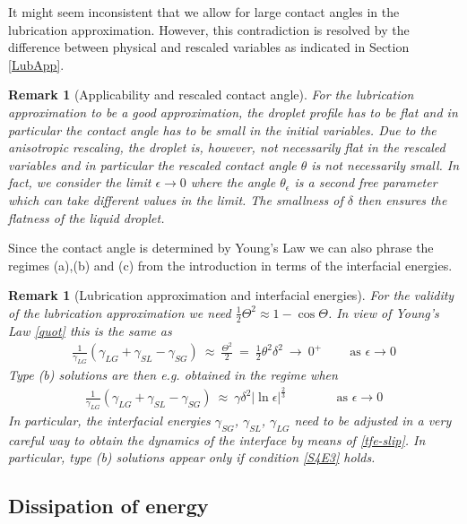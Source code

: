\documentclass[pagesize,pdftex]{amsart}
\newtheorem{remark}[theorem]{Remark}
\renewcommand{\d}{\delta}
\newcommand{\gam}{\gamma}
\newcommand{\eps}{\epsilon}
\newcommand{\ang}{\theta}
\begin{document}
 It might seem inconsistent that we allow for large contact angles in the
 lubrication approximation. However, this contradiction is resolved by the
 difference between physical and rescaled variables as indicated in Section
 \ref{LubApp}.
 \begin{remark}[Applicability and rescaled contact angle] \label{rem-consist} %
   \text{} %
   For the lubrication approximation to be a good approximation, the droplet
   profile has to be flat and in particular the contact angle has to be small in
   the initial variables.  Due to the anisotropic rescaling, the droplet is,
   however, not necessarily flat in the rescaled variables and in particular the
   rescaled contact angle $\ang$ is not necessarily small. In fact, we consider
   the limit $\eps \to 0$ where the angle $\ang_\eps$ is a second free parameter
   which can take different values in the limit. The smallness of $\delta$ then
   ensures the flatness of the liquid droplet.
\end{remark}
Since the contact angle is determined by Young's Law we can also phrase the
regimes (a),(b) and (c) from the introduction in terms of the interfacial
energies.
\begin{remark}[Lubrication approximation and interfacial energies]
  For the validity of the lubrication approximation we need
  $\frac 12 \Theta^2 \approx 1 - \cos \Theta$. In view of Young's Law
  \eqref{quot} this is the same as
  \begin{align}
      \frac 1{\gam_{LG}} (\gam_{LG} + \gam_{SL} - \gam_{SG})  \ %
      \approx  \ \frac {\Theta^2}{2} \ %
      = \ \frac 12 \ang^2 \d^2 \ %
      \to \ 0^+ \ \qquad %
      \text{as\ $\eps \to 0$}  \label{S4E2}
  \end{align}
  Type (b) solutions are then e.g. obtained in the regime when
  \begin{align}
      \frac 1{\gam_{LG}} (\gam_{LG} + \gam_{SL} - \gam_{SG})  \ %
    \approx \ \gam \d^2 |\ln \eps|^{\frac{2}{3}} \qquad\qquad %
   \text{as\ $\eps \to 0$}  \label{S4E3}    
  \end{align}
  In particular, the interfacial energies $\gam_{SG}$, $\gam_{SL}$, $\gam_{LG}$
  need to be adjusted in a very careful way to obtain the dynamics of the
  interface by means of \eqref{tfe-slip}. In particular, type (b) solutions
  appear only if condition \eqref{S4E3} holds.
\end{remark}

\subsection{Dissipation of energy  \label{sec-regime}}
\end{document}
